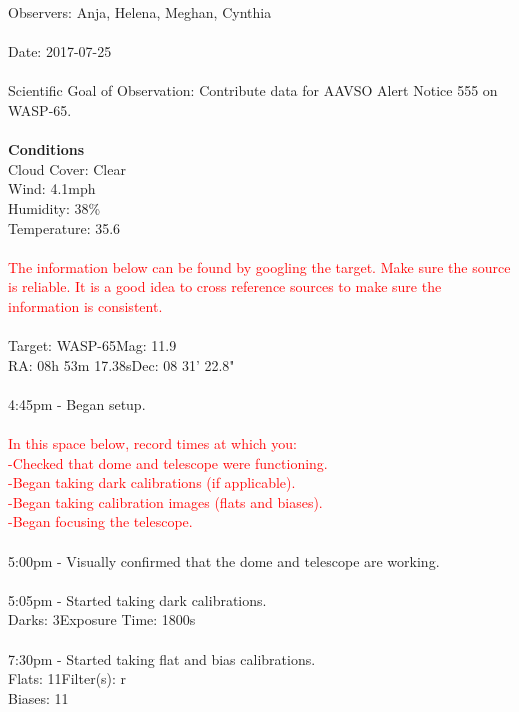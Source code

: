 \documentclass[11pt]{report}
\begin{document}
Observers: Anja, Helena, Meghan,  Cynthia \\ \\
Date: 2017-07-25 \\ \\
Scientific Goal of Observation: Contribute data for AAVSO Alert Notice 555 on WASP-65. \\ \\
{\bf Conditions \\}
Cloud Cover: Clear \\
Wind: 4.1mph \\
Humidity: 38\% \\
Temperature: 35.6 \\ \\
\textcolor{red}{The information below can be found by googling the target. Make sure the source is reliable. It is a good idea to cross reference sources to make sure the information is consistent.} \\ \\
Target: WASP-65\hspace{75pt}Mag: 11.9 \\
RA: 08h 53m 17.38s\hspace{64pt}Dec: 08\degree{} 31' 22.8" \\ \\
4:45pm - Began setup. \\ \\
\textcolor{red}{In this space below, record times at which you: \\
-Checked that dome and telescope were functioning. \\
-Began taking dark calibrations (if applicable). \\
-Began taking calibration images (flats and biases). \\
-Began focusing the telescope.} \\ \\
5:00pm - Visually confirmed that the dome and telescope are working. \\ \\
5:05pm - Started taking dark calibrations. \\
Darks: 3\hspace{72pt}Exposure Time:  1800s \\ \\
7:30pm - Started taking flat and bias calibrations. \\
Flats: 11\hspace{72pt}Filter(s): r \\
Biases: 11 \\ \\
\end{document}
